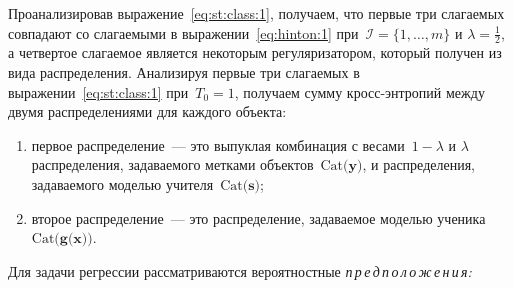 \documentclass{dissert}
\begin{document}
Проанализировав выражение~\eqref{eq:st:class:1}, получаем, что первые три слагаемых совпадают со слагаемыми в выражении~\eqref{eq:hinton:1} при~$\mathcal{I} = \{1, \ldots, m\}$ и $\lambda=\frac{1}{2}$, а четвертое слагаемое является некоторым регуляризатором, который получен из вида распределения. Анализируя первые три слагаемых в выражении~\eqref{eq:st:class:1} при~$T_0 = 1$, получаем сумму кросс-энтропий между двумя распределениями для каждого объекта:
\begin{enumerate}[1)]
	\item первое распределение~--- это выпуклая комбинация с весами~$1-\lambda$ и $\lambda$ распределения, задаваемого метками объектов~$\text{Cat}\bigr(\mathbf{y}\bigr)$, и распределения, задаваемого моделью учителя~$\text{Cat}\bigr(\mathbf{s}\bigr)$;
	\item второе распределение~--- это распределение, задаваемое моделью ученика~$\text{Cat}\bigr(\mathbf{g}\bigr(\mathbf{x}\bigr)\bigr)$.
\end{enumerate}

Для задачи регрессии рассматриваются вероятностные \emph{п\,р\,е\,д\,п\,о\,л\,о\,ж\,е\,н\,и\,я:}
\end{document}
